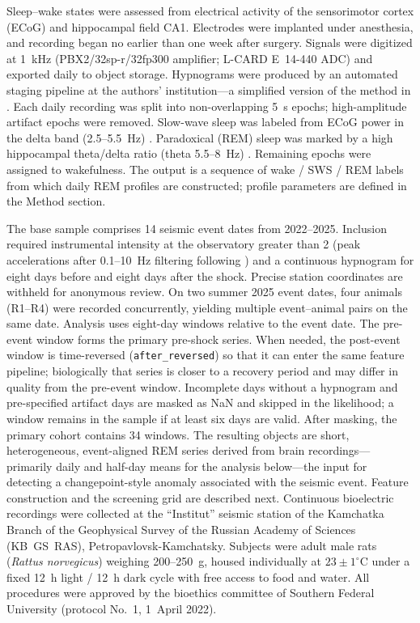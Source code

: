 Sleep–wake states were assessed from electrical activity of the sensorimotor cortex (ECoG) and hippocampal field CA1. Electrodes were implanted under anesthesia, and recording began no earlier than one week after surgery. Signals were digitized at 1~kHz (PBX2/32sp-r/32fp300 amplifier; L-CARD E~14-440 ADC) and exported daily to object storage. Hypnograms were produced by an automated staging pipeline at the authors' institution---a simplified version of the method in \cite{Saevskiy2025}. Each daily recording was split into non-overlapping 5~s epochs; high-amplitude artifact epochs were removed. Slow-wave sleep was labeled from ECoG power in the delta band (2.5–5.5~Hz) \cite{Fang2010}. Paradoxical (REM) sleep was marked by a high hippocampal theta/delta ratio (theta 5.5–8~Hz) \cite{Fang2010,Saevskiy2025}. Remaining epochs were assigned to wakefulness. The output is a sequence of wake / SWS / REM labels from which daily REM profiles are constructed; profile parameters are defined in the Method section.

The base sample comprises 14 seismic event dates from 2022–2025. Inclusion required instrumental intensity at the observatory greater than 2 (peak accelerations after 0.1–10~Hz filtering following \cite{GOST2017}) and a continuous hypnogram for eight days before and eight days after the shock. Precise station coordinates are withheld for anonymous review. On two summer 2025 event dates, four animals (R1–R4) were recorded concurrently, yielding multiple event–animal pairs on the same date. Analysis uses eight-day windows relative to the event date. The pre-event window forms the primary pre-shock series. When needed, the post-event window is time-reversed (\texttt{after\_reversed}) so that it can enter the same feature pipeline; biologically that series is closer to a recovery period and may differ in quality from the pre-event window. Incomplete days without a hypnogram and pre-specified artifact days are masked as NaN and skipped in the likelihood; a window remains in the sample if at least six days are valid. After masking, the primary cohort contains 34 windows. The resulting objects are short, heterogeneous, event-aligned REM series derived from brain recordings---primarily daily and half-day means for the analysis below---the input for detecting a changepoint-style anomaly associated with the seismic event. Feature construction and the screening grid are described next.
\else
Continuous bioelectric recordings were collected at the ``Institut'' seismic station of the Kamchatka Branch of the Geophysical Survey of the Russian Academy of Sciences (KB~GS~RAS), Petropavlovsk-Kamchatsky. Subjects were adult male rats (\textit{Rattus norvegicus}) weighing 200–250~g, housed individually at \(23\pm 1^{\circ}\)C under a fixed 12~h light / 12~h dark cycle with free access to food and water. All procedures were approved by the bioethics committee of Southern Federal University (protocol No.~1, 1~April 2022).

